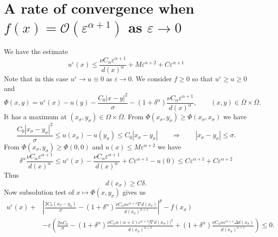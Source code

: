 \documentclass[10pt]{article}
\theoremstyle{plain}
\theoremstyle{remark}
\begin{document}
\section{A rate of convergence when $f(x) = \mathcal{O}\left(\varepsilon^{\alpha+1}\right)$ as $\varepsilon\to 0$}
We have the estimate
\begin{equation*}
    u^\varepsilon(x)\leq \frac{\nu C_\alpha \varepsilon^{\alpha+1}}{d(x)^\alpha} + M\varepsilon^{\alpha+2} + C\varepsilon^{\alpha+1}
\end{equation*}
Note that in this case $u^\varepsilon \to u \equiv 0$ as $\varepsilon\to 0$. We consider $f\geq 0$ so that $u^\varepsilon\geq u\geq 0$ and
\begin{equation*}
    \Phi(x,y) = u^\varepsilon(x) - u(y) - \frac{C_0|x-y|^2}{\sigma} - (1+\delta^\alpha)\frac{\nu C_\alpha \varepsilon^{\alpha+1}}{d(x)^\alpha}, \qquad (x,y)\in \overline{\Omega}\times\overline{\Omega}.
\end{equation*}
It has a maximum at $(x_\sigma,y_\sigma)\in \Omega\times\overline{\Omega}$. From $\Phi(x_\sigma,y_\sigma)\geq \Phi(x_\sigma,x_\sigma)$ we have
\begin{equation*}
    \frac{C_0|x_\sigma-y_\sigma|^2}{\sigma}\leq u(x_\sigma) - u(y_\sigma)\leq C_0|x_\sigma - y_\sigma| \qquad\Longrightarrow\qquad |x_\sigma - y_\sigma|\leq \sigma.
\end{equation*}
From $\Phi(x_\sigma,y_\sigma)\geq \Phi(0,0)$ and $u(x)\leq M\varepsilon^{\alpha+2}$ we have
\begin{equation*}
    \delta^\alpha\frac{\nu C_\alpha \varepsilon^{\alpha+1}}{d(x)^\alpha} \leq u^\varepsilon(x) - \frac{\nu C_\alpha \varepsilon^{\alpha+1}}{d(x)^\alpha} + C\varepsilon^{\alpha+1} - u(0) \leq C\varepsilon^{\alpha+1}+C\varepsilon^{\alpha+2}
\end{equation*}
Thus
\begin{equation*}
    d(x_\sigma) \geq C\delta.
\end{equation*}
Now subsolution test of $x\mapsto \Phi(x,y_\sigma)$ gives us
\begin{equation*}
\begin{split}
    u^\varepsilon(x) + &\left|\frac{2C_0(x_\sigma-y_\sigma)}{\sigma}-(1+\delta^\alpha)\frac{\nu C_\alpha\alpha\varepsilon^{\alpha+1}\nabla d(x_\sigma)}{d(x_\sigma)^{\alpha+1}}\right|^p - f(x_\sigma) \\
    &- \varepsilon \left(\frac{2nC_0}{\sigma} - (1+\delta^\alpha)\frac{\nu C_\alpha\alpha(\alpha + 1)\varepsilon^{\alpha+1}|\nabla d(x_\sigma)|^2}{d(x_\sigma)^{\alpha+2}} + (1+\delta^\alpha)\frac{\nu C_\alpha \alpha \varepsilon^{\alpha+1}\Delta d(x_\sigma)}{d(x_\sigma)^{\alpha+1}}\right)\leq 0.
\end{split}    
\end{equation*}
\end{document}
